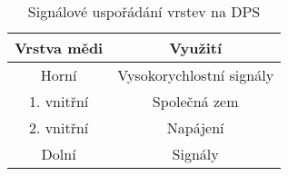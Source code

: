 \begin{table}[h!]
\centering

\begin{tabular}{|c|c|}
\hline 
Vrstva mědi & Využití \\ 
\hline 
\hline 
Horní & Vysokorychlostní signály \\ 
\hline 
1. vnitřní & Společná zem \\ 
\hline 
2. vnitřní & Napájení \\ 
\hline 
Dolní & Signály \\ 
\hline 
\end{tabular} 

\caption{Signálové uspořádání vrstev na DPS} 
\label{table:signalStackup}
\end{table} 